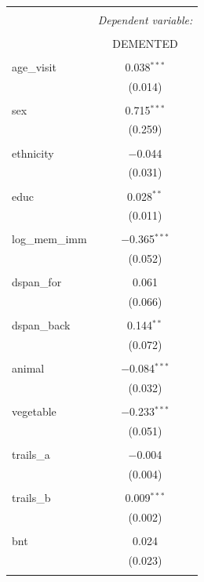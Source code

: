 \documentclass[a4paper,man,natbib,11pt]{article}
\begin{document}
\begin{table}[!htbp] \centering 
  \caption{} 
  \label{} 
\begin{tabular}{@{\extracolsep{5pt}}lc} 
\\[-1.8ex]\hline 
\hline \\[-1.8ex] 
 & \multicolumn{1}{c}{\textit{Dependent variable:}} \\ 
\cline{2-2} 
\\[-1.8ex] & DEMENTED \\ 
\hline \\[-1.8ex] 
 age\_visit & 0.038$^{***}$ \\ 
  & (0.014) \\ 
  & \\ 
 sex & 0.715$^{***}$ \\ 
  & (0.259) \\ 
  & \\ 
 ethnicity & $-$0.044 \\ 
  & (0.031) \\ 
  & \\ 
 educ & 0.028$^{**}$ \\ 
  & (0.011) \\ 
  & \\ 
 log\_mem\_imm & $-$0.365$^{***}$ \\ 
  & (0.052) \\ 
  & \\ 
 dspan\_for & 0.061 \\ 
  & (0.066) \\ 
  & \\ 
 dspan\_back & 0.144$^{**}$ \\ 
  & (0.072) \\ 
  & \\ 
 animal & $-$0.084$^{***}$ \\ 
  & (0.032) \\ 
  & \\ 
 vegetable & $-$0.233$^{***}$ \\ 
  & (0.051) \\ 
  & \\ 
 trails\_a & $-$0.004 \\ 
  & (0.004) \\ 
  & \\ 
 trails\_b & 0.009$^{***}$ \\ 
  & (0.002) \\ 
  & \\ 
 bnt & 0.024 \\ 
  & (0.023) \\ 
  & \\ 

\end{tabular}
\end{table}
\end{document}
